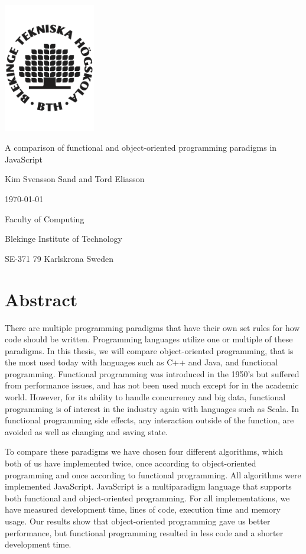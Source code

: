 \documentclass {article}
\begin{document}
\begin{titlepage}
	\centering
	\includegraphics[width=0.3\textwidth]{bth-logo} \par
	{\LARGE A comparison of functional and object-oriented programming paradigms in JavaScript \par}
	\vspace{1cm}
{\large Kim Svensson Sand and Tord Eliasson \par}
{\large \today \par}
	\vfill

	{\normalsize Faculty of Computing \par}
	{\normalsize Blekinge Institute of Technology \par}
	{\normalsize SE-371 79 Karlskrona Sweden \par}
\end{titlepage}
\newpage
\section*{Abstract}
There are multiple programming paradigms that have their own set rules for how code should be written. Programming languages utilize one or multiple of these paradigms. In this thesis, we will compare object-oriented programming, that is the most used today with languages such as C++ and Java, and functional programming. Functional programming was introduced in the 1950's but suffered from performance issues, and has not been used much except for in the academic world. However, for its ability to handle concurrency and big data, functional programming is of interest in the industry again with languages such as Scala. In functional programming side effects, any interaction outside of the function, are avoided as well as changing and saving state. 

To compare these paradigms we have chosen four different algorithms, which both of us have implemented twice, once according to object-oriented programming and once according to functional programming. All algorithms were implemented JavaScript. JavaScript is a multiparadigm language that supports both functional and object-oriented programming. For all implementations, we have measured development time, lines of code, execution time and memory usage. Our results show that object-oriented programming gave us better performance, but functional programming resulted in less code and a shorter development time. 
\end{document}
